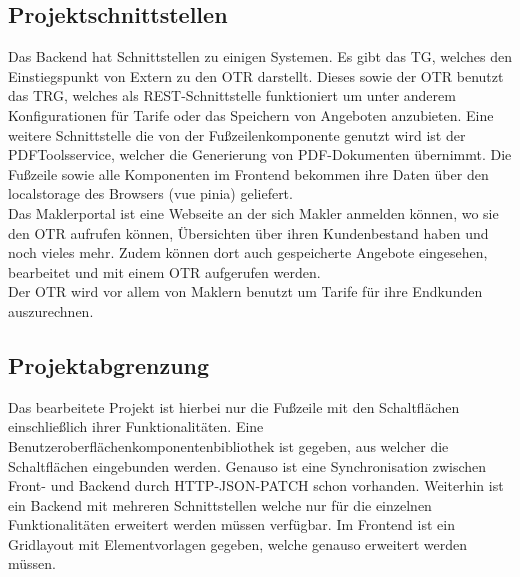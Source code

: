 \subsection{Projektschnittstellen}
\label{projektschnittstellen}
Das Backend hat Schnittstellen zu einigen Systemen. Es gibt das \ac{TG}, welches den Einstiegspunkt von Extern zu den \ac{OTR} darstellt. Dieses sowie der \ac{OTR} benutzt das \ac{TRG}, welches als REST-Schnittstelle funktioniert um unter anderem Konfigurationen für Tarife oder das Speichern von Angeboten anzubieten.
Eine weitere Schnittstelle die von der Fußzeilenkomponente genutzt wird ist der PDFToolsservice, welcher die Generierung von PDF-Dokumenten übernimmt. Die Fußzeile sowie alle Komponenten im Frontend bekommen ihre Daten über den \gls{localstorage} des Browsers (\gls{vue} \gls{pinia}) geliefert.\\
Das Maklerportal ist eine Webseite an der sich Makler anmelden können, wo sie den \ac{OTR} aufrufen können, Übersichten über ihren Kundenbestand haben und noch vieles mehr. Zudem können dort auch gespeicherte Angebote eingesehen, bearbeitet und mit einem \ac{OTR} aufgerufen werden.\\
Der \ac{OTR} wird vor allem von Maklern benutzt um Tarife für ihre Endkunden auszurechnen.


\subsection{Projektabgrenzung}
\label{projektabgrenzung}
Das bearbeitete Projekt ist hierbei nur die Fußzeile mit den Schaltflächen einschließlich ihrer Funktionalitäten. Eine Benutzeroberflächenkomponentenbibliothek ist gegeben, aus welcher die Schaltflächen eingebunden werden. Genauso ist eine Synchronisation zwischen Front- und Backend durch HTTP-JSON-PATCH schon vorhanden. Weiterhin ist ein Backend mit mehreren Schnittstellen welche nur für die einzelnen Funktionalitäten erweitert werden müssen verfügbar. Im Frontend ist ein Gridlayout mit Elementvorlagen gegeben, welche genauso erweitert werden müssen.